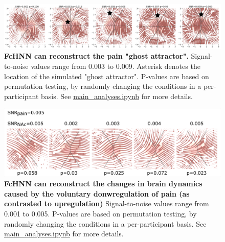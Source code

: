 \documentclass{article}
\begin{document}
\begin{figure}[!htbp]
\centering
\includegraphics[width=0.7\linewidth]{files/si_pain_ghost_attrac-9e7d8b776d9d3873943e93bd0da5a993.png}
\caption[]{\textbf{FcHNN can reconstruct the pain "ghost attractor".}
Signal-to-noise values range from 0.003 to 0.009. Asterisk denotes the location of the simulated "ghost attractor". P-values are based on permutation testing, by randomly changing the conditions in a per-participant basis. See \href{https://github.com/pni-lab/connattractor/blob/master/notebooks/main\_analyses.ipynb}{main\_analyses.ipynb} for more details.}
\label{si_pain_ghost_attractor_sim}
\end{figure}

\begin{figure}[!htbp]
\centering
\includegraphics[width=0.7\linewidth]{files/si_downreg_trajector-2254d465724367ab05ec3b7052fa8c68.png}
\caption[]{\textbf{FcHNN can reconstruct the changes in brain dynamics caused by the voluntary donwregulation of pain (as contrasted to upregulation)}
Signal-to-noise values range from 0.001 to 0.005. P-values are based on permutation testing, by randomly changing the conditions in a per-participant basis. See \href{https://github.com/pni-lab/connattractor/blob/master/notebooks/main\_analyses.ipynb}{main\_analyses.ipynb} for more details.}
\label{si_downreg_trajectory_sim}
\end{figure}
\end{document}
